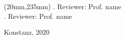 \begin{textblock*}{80mm}(20mm,235mm) %
  \large\mdseries\sffamily
  {
    . Reviewer: Prof. name \\

    . Reviewer: Prof. name
  }

      \null
  \vspace{4mm}
    \large\mdseries\sffamily
      \noindent
  Konstanz, 2020
\end{textblock*}
